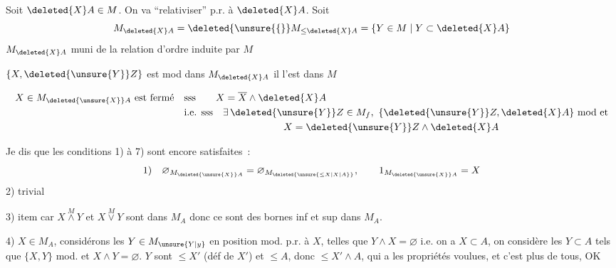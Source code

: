 Soit $\deleted{X}A\in M$. On va ``relativiser''  p.r. à $\deleted{X}A$. Soit 
\[
M_{\deleted{X}A}=\deleted{\unsure{\{}}M_{\leq\deleted{X}A}=\{Y\in M\mid Y\subset\deleted{X}A\}
\]
$M_{\deleted{X}A}$ muni de la relation d'ordre induite par $M$

$\{X,\deleted{\unsure{Y}}Z\}$ est mod dans $M_{\deleted{X}A}$  il l'est dans $M$

\[
\begin{aligned}
X\in M_{\deleted{\unsure{X}}A}\text{ est fermé}\quad &\text{sss}\qquad X=\overline X\wedge\deleted{X}A\\
&\text{i.e. sss}\quad\exists\,\deleted{\unsure{Y}}Z\in M_f,\ \{\deleted{\unsure{Y}}Z,\deleted{X}A\}\ \text{mod et}\\
&\hspace{10em}X=\deleted{\unsure{Y}}Z\wedge\deleted{X}A
\end{aligned}
\]

Je dis que les conditions 1) à 7) sont encore satisfaites~:
\[
\text{1)}\quad\varnothing_{M_{\deleted{\unsure{X}}A}}=\varnothing_{M_{\deleted{\unsure{\leq X|X|A}}}},\qquad 1_{M_{\deleted{\unsure{X}}A}}=X
\]
2)  trivial

3) item car  $X\overset{M}{\wedge}Y$ et $X\overset{M}{\vee}Y$ sont dans $M_A$ donc ce sont des bornes inf et sup dans $M_A$.

4)  $X\in M_A$, considérons les $Y\in M_{\unsure{Y|y}}$ en position mod. p.r. à $X$, telles que $Y\wedge X=\varnothing$ i.e.  on a $X\subset A$, on considère les $Y\subset A$ tels que $\{X,Y\}$ mod. et $X\wedge Y=\varnothing$.  $Y$ sont $\leq X'$ (déf de $X'$) et $\leq A$, donc $\leq X'\wedge A$, qui a les propriétés voulues, et c'est  plus  de tous, OK

